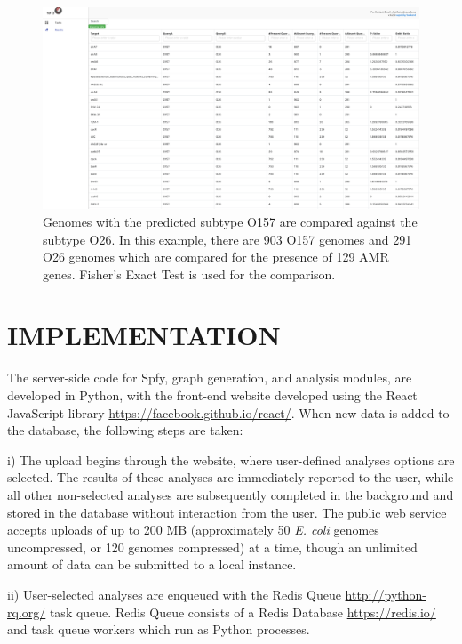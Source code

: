 \documentclass{article}
\begin{document}
\begin{figure}[!hb]
\begin{center}
\includegraphics[width=\textwidth]{images/o157vo26_amrgenes}
\end{center}
\caption{
Genomes with the predicted subtype O157 are compared against the subtype O26. In this example, there are 903 O157 genomes and 291 O26 genomes which are compared for the presence of 129 AMR genes. Fisher's Exact Test is used for the comparison.}
\label{fig-groupings}
\end{figure}

\section{IMPLEMENTATION}
The server-side code for Spfy, graph generation, and analysis modules, are developed in Python, with the front-end website developed using the React JavaScript library \url{https://facebook.github.io/react/}. When new data is added to the database, the following steps are taken:

i) The upload begins through the website, where user-defined analyses options are selected. The results of these analyses are immediately reported to the user, while all other non-selected analyses are subsequently completed in the background and stored in the database without interaction from the user. The public web service accepts uploads of up to 200 MB (approximately 50 \textit {E. coli} genomes uncompressed, or 120 genomes compressed) at a time, though an unlimited amount of data can be submitted to a local instance.

ii) User-selected analyses are enqueued with the Redis Queue \url{http://python-rq.org/} task queue. Redis Queue consists of a Redis Database \url{https://redis.io/} and task queue workers which run as Python processes.
\end{document}
